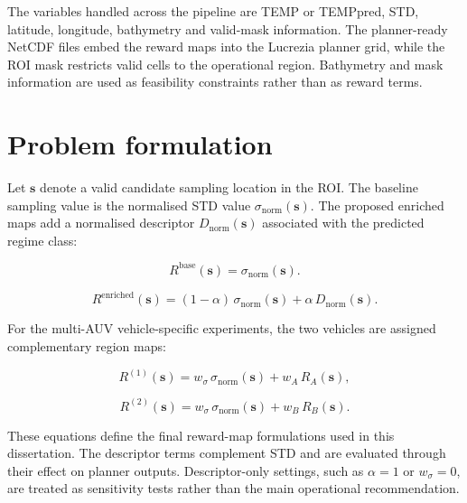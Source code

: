 The variables handled across the pipeline are TEMP or TEMPpred, STD, latitude, longitude, bathymetry and valid-mask information. The planner-ready NetCDF files embed the reward maps into the Lucrezia planner grid, while the ROI mask restricts valid cells to the operational region. Bathymetry and mask information are used as feasibility constraints rather than as reward terms.

\section{Problem formulation}

Let $\mathbf{s}$ denote a valid candidate sampling location in the ROI. The baseline sampling value is the normalised STD value $\sigma_{\mathrm{norm}}(\mathbf{s})$. The proposed enriched maps add a normalised descriptor $D_{\mathrm{norm}}(\mathbf{s})$ associated with the predicted regime class:

\begin{equation}
R^{\mathrm{base}}(\mathbf{s}) =
\sigma_{\mathrm{norm}}(\mathbf{s}).
\label{eq:ch4_baseline_reward}
\end{equation}

\begin{equation}
R^{\mathrm{enriched}}(\mathbf{s}) =
(1-\alpha)\,\sigma_{\mathrm{norm}}(\mathbf{s})
+
\alpha\,D_{\mathrm{norm}}(\mathbf{s}).
\label{eq:ch4_single_reward}
\end{equation}

For the multi-AUV vehicle-specific experiments, the two vehicles are assigned complementary region maps:

\begin{equation}
R^{(1)}(\mathbf{s}) =
w_{\sigma}\,\sigma_{\mathrm{norm}}(\mathbf{s})
+
w_A\,R_A(\mathbf{s}),
\label{eq:ch4_multi_reward_1}
\end{equation}

\begin{equation}
R^{(2)}(\mathbf{s}) =
w_{\sigma}\,\sigma_{\mathrm{norm}}(\mathbf{s})
+
w_B\,R_B(\mathbf{s}).
\label{eq:ch4_multi_reward_2}
\end{equation}

These equations define the final reward-map formulations used in this dissertation. The descriptor terms complement STD and are evaluated through their effect on planner outputs. Descriptor-only settings, such as $\alpha=1$ or $w_{\sigma}=0$, are treated as sensitivity tests rather than the main operational recommendation.

